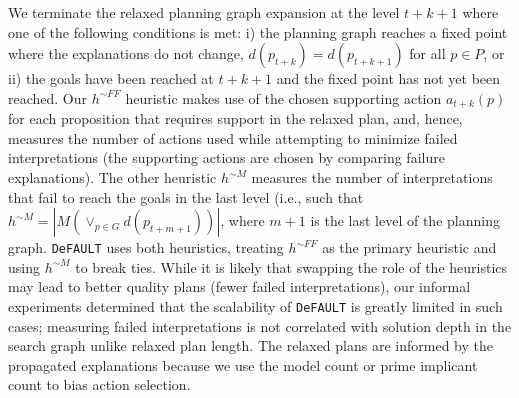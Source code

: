 \documentclass{article}
\def\und#1{\noindent{\bf #1}:}
\def\FFRISKY{{\tt DeFAULT}}
\def\und#1{\medskip{\noindent\bf #1:}}
\begin{document}

\und{Heuristic Computation}   We terminate the relaxed planning graph expansion
at the level $t+k+1$ where one of the following conditions is met: i) the
planning graph reaches a fixed point where the explanations do not change,
${d}(p_{t+k}) = {d}(p_{t+k+1})$ for all $p\in P$, or ii) the goals have been
reached at $t+k+1$ and the fixed point has not yet been reached. Our $h^{\sim
FF}$ heuristic makes use of the chosen supporting action ${a}_{t+k}(p)$ for each
proposition that requires support in the relaxed plan, and, hence, measures the
number of actions used while attempting to minimize failed interpretations
(the supporting actions are chosen by comparing failure explanations). The other
heuristic $h^{\sim M}$ measures the number of interpretations that fail to reach the goals in the last level (i.e., such that  $h^{\sim M} = |M(\vee_{p \in
G} {d}(p_{t+m+1}))|$, where $m+1$ is the last level of the planning graph. 
\FFRISKY{} uses both heuristics, treating  $h^{\sim FF}$ as the primary
heuristic and using $h^{\sim M}$ to break ties.  While it is likely that
swapping the role of the heuristics may lead to better quality plans (fewer
failed interpretations), our informal experiments determined that the
scalability of \FFRISKY{} is greatly limited in such cases; measuring failed
interpretations is not correlated with solution depth in the search graph unlike
relaxed plan length.  The relaxed plans are informed by the propagated
explanations because we use the model count or prime implicant count to bias
action selection.
\end{document}

